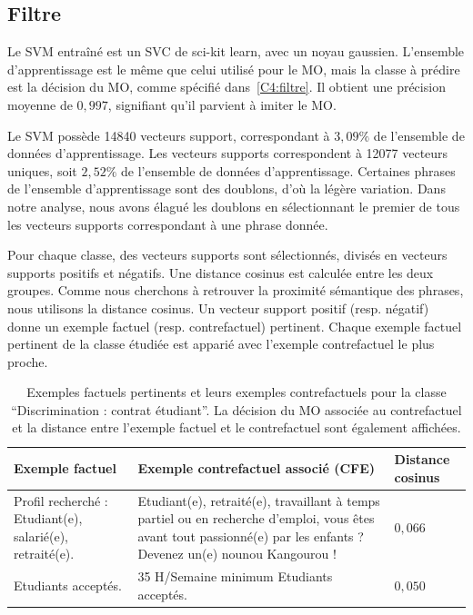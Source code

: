 \subsection{Filtre} \label{C4:app_filtre}

Le SVM entraîné est un SVC de sci-kit learn, avec un noyau gaussien. L'ensemble d'apprentissage est le même que celui utilisé pour le MO, mais la classe à prédire est la décision du MO, comme spécifié dans~\ref{C4:filtre}. Il obtient une précision moyenne de $0,997$, signifiant qu'il parvient à imiter le MO.

Le SVM possède 14840 vecteurs support, correspondant à $3,09\%$ de l'ensemble de données d'apprentissage. Les vecteurs supports correspondent à 12077 vecteurs uniques, soit $2,52\%$ de l'ensemble de données d'apprentissage. Certaines phrases de l'ensemble d'apprentissage sont des doublons, d'où la légère variation. Dans notre analyse, nous avons élagué les doublons en sélectionnant le premier de tous les vecteurs supports correspondant à une phrase donnée.

Pour chaque classe, des vecteurs supports sont sélectionnés, divisés en vecteurs supports positifs et négatifs. Une distance cosinus est calculée entre les deux groupes. Comme nous cherchons à retrouver la proximité sémantique des phrases, nous utilisons la distance cosinus. Un vecteur support positif (resp. négatif) donne un exemple factuel (resp. contrefactuel) pertinent. Chaque exemple factuel pertinent de la classe étudiée est apparié avec l'exemple contrefactuel le plus proche.

\begin{table}
    \caption{Exemples factuels pertinents et leurs exemples contrefactuels pour la classe ``Discrimination : contrat étudiant''. La décision du MO associée au contrefactuel et la distance entre l'exemple factuel et le contrefactuel sont également affichées.} \label{tab:results_student}
    \begin{tabular}{|p{}|p{}|p{}|}
        \hline
        \textbf{Exemple factuel } & \textbf{Exemple contrefactuel associé (CFE)} & \textbf{Distance cosinus} \\ \hline
        Profil recherché : Etudiant(e), salarié(e), retraité(e). & Etudiant(e), retraité(e), travaillant à temps partiel ou en recherche d'emploi, vous êtes avant tout passionné(e) par les enfants ? Devenez un(e) nounou Kangourou ! & $0,066$ \\ \hline
        Etudiants acceptés. & 35 H/Semaine minimum Etudiants acceptés. & $0,050$ \\ \hline
    \end{tabular}
\end{table}

